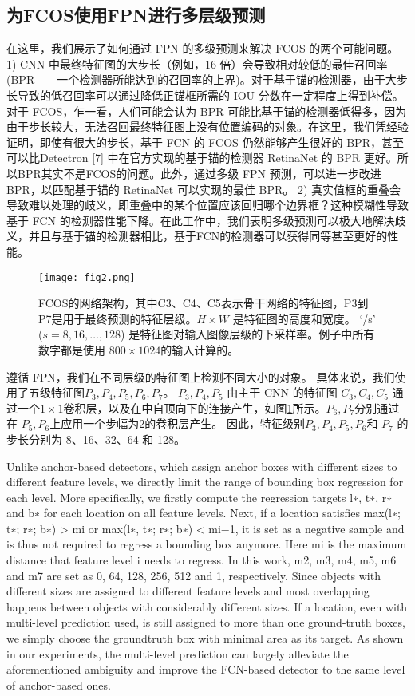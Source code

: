 \documentclass[../main.tex]{subfile}
\begin{document}
\subsection{为FCOS使用FPN进行多层级预测}

在这里，我们展示了如何通过 FPN\cite{fpn} 的多级预测来解决 FCOS 的两个可能问题。 1) CNN 中最终特征图的大步长（例如，16 倍）会导致相对较低的最佳召回率 (BPR——一个检测器所能达到的召回率的上界)。对于基于锚的检测器，由于大步长导致的低召回率可以通过降低正锚框所需的 IOU 分数在一定程度上得到补偿。对于 FCOS，乍一看，人们可能会认为 BPR 可能比基于锚的检测器低得多，因为由于步长较大，无法召回最终特征图上没有位置编码的对象。在这里，我们凭经验证明，即使有很大的步长，基于 FCN 的 FCOS 仍然能够产生很好的 BPR，甚至可以比Detectron [7] 中在官方实现的基于锚的检测器 RetinaNet\cite{retinanet} 的 BPR 更好。所以BPR其实不是FCOS的问题。此外，通过多级 FPN 预测\cite{fpn}，可以进一步改进 BPR，以匹配基于锚的 RetinaNet 可以实现的最佳 BPR。 2) 真实值框的重叠会导致难以处理的歧义，即重叠中的某个位置应该回归哪个边界框？这种模糊性导致基于 FCN 的检测器性能下降。在此工作中，我们表明多级预测可以极大地解决歧义，并且与基于锚的检测器相比，基于FCN的检测器可以获得同等甚至更好的性能。

\begin{figure}[htb]
    \centering
    \texttt{[image: fig2.png]}
    \caption{FCOS的网络架构，其中C3、C4、C5表示骨干网络的特征图，P3到P7是用于最终预测的特征层级。$H \times  W$ 是特征图的高度和宽度。 ‘/s’ ($s = 8,16,\ldots,128$) 是特征图对输入图像层级的下采样率。例子中所有数字都是使用 $800 \times  1024$的输入计算的。}
    \label{fig:fig2}
\end{figure}

遵循 FPN\cite{fpn}，我们在不同层级的特征图上检测不同大小的对象。 具体来说，我们使用了五级特征图$P_3,P_4,P_5,P_6,P_7$。 $P_3,P_4,P_5$ 由主干 CNN 的特征图 $C_3,C_4,C_5$ 通过一个$ 1\times 1 $卷积层，以及在\cite{fpn}中自顶向下的连接产生，如图\ref{fig:fig2}所示。$P_6,P_7$分别通过在 $P_5,P_6$上应用一个步幅为2的卷积层产生。 因此，特征级别$P_3,P_4,P_5,P_6$和 $P_7$ 的步长分别为 8、16、32、64 和 128。

Unlike anchor-based detectors, which assign anchor boxes with different sizes to different feature levels, we directly limit the range of bounding box regression for each level. More specifically, we firstly compute the regression targets l∗, t∗, r∗ and b∗ for each location on all feature levels. Next, if a location satisfies max(l∗; t∗; r∗; b∗) > mi or max(l∗, t∗; r∗; b∗) < mi−1, it is set as a negative sample and is thus not required to regress a bounding box anymore. Here mi is the maximum distance that feature level i needs to regress. In this work, m2, m3, m4, m5, m6 and m7 are set as 0, 64, 128, 256, 512 and 1, respectively. Since objects with different sizes are assigned to different feature levels and most overlapping happens between objects with considerably different sizes. If a location, even with multi-level prediction used, is still assigned to more than one ground-truth boxes, we simply choose the groundtruth box with minimal area as its target. As shown in our experiments, the multi-level prediction can largely alleviate the aforementioned ambiguity and improve the FCN-based detector to the same level of anchor-based ones.
\end{document}
